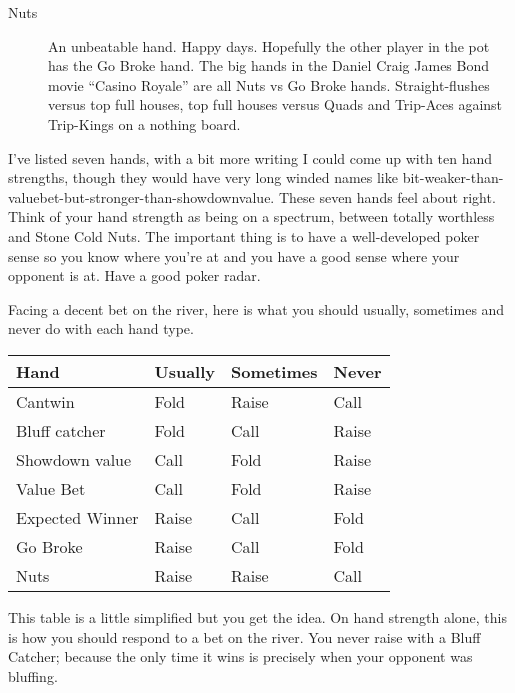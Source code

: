 \begin{description}
\item[Nuts] An unbeatable hand. Happy days. Hopefully the other player
in the pot has the Go Broke hand. The big hands in the Daniel Craig
James Bond movie ``Casino Royale'' are all Nuts vs Go Broke hands.
Straight-flushes versus top full houses, top full houses versus
Quads and Trip-Aces against Trip-Kings on a nothing board.

\end{description}


I've listed seven hands, with a bit more writing
I could come up with ten hand strengths, though they would have
very long winded names like
bit-weaker-than-valuebet-but-stronger-than-showdownvalue. These
seven hands feel about right. Think of
your hand strength as being on a spectrum, between totally
worthless and Stone Cold Nuts. The important thing is to have
a well-developed poker sense so you know where you're at and you
have a good sense where your opponent is at. Have a good poker radar.

Facing a decent bet on the river, here is what you should
usually, sometimes and never do with each hand type.

\begin{tabular}{|l|l|l|l|} \hline
Hand    &  Usually & Sometimes & Never \\ \hline
Cantwin & Fold  & Raise     & Call  \\ \hline
Bluff catcher  & Fold & Call & Raise \\ \hline
Showdown value & Call & Fold & Raise \\ \hline
Value Bet & Call & Fold & Raise \\ \hline
Expected Winner & Raise & Call & Fold \\ \hline
Go Broke & Raise & Call & Fold \\ \hline
Nuts     & Raise & Raise & Call \\ \hline
\end{tabular}

This table is a little simplified but you get the idea. On hand strength
alone, this is how you should respond to a bet on the river. You never
raise with a Bluff Catcher; because the only time it wins is precisely
when your opponent was bluffing.
